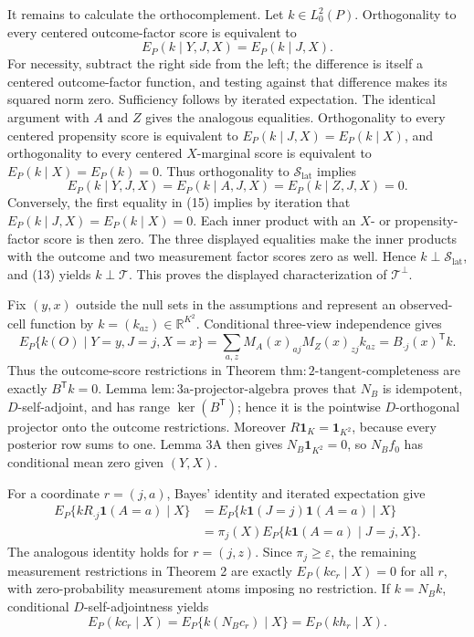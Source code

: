 It remains to calculate the orthocomplement.  Let \(k\in L^2_0(P)\).  Orthogonality to every centered outcome-factor score is equivalent to
\[
 E_P(k\mid Y,J,X)=E_P(k\mid J,X). \tag{14}
\]
For necessity, subtract the right side from the left; the difference is itself a centered outcome-factor function, and testing against that difference makes its squared norm zero.  Sufficiency follows by iterated expectation.  The identical argument with \(A\) and \(Z\) gives the analogous equalities.  Orthogonality to every centered propensity score is equivalent to
\(E_P(k\mid J,X)=E_P(k\mid X)\), and orthogonality to every centered \(X\)-marginal score is equivalent to \(E_P(k\mid X)=E_P(k)=0\).  Thus orthogonality to \(\mathcal S_{\mathrm{lat}}\) implies
\[
 E_P(k\mid Y,J,X)=E_P(k\mid A,J,X)=E_P(k\mid Z,J,X)=0. \tag{15}
\]
Conversely, the first equality in (15) implies by iteration that \(E_P(k\mid J,X)=E_P(k\mid X)=0\).  Each inner product with an \(X\)- or propensity-factor score is then zero.  The three displayed equalities make the inner products with the outcome and two measurement factor scores zero as well.  Hence \(k\perp\mathcal S_{\mathrm{lat}}\), and (13) yields \(k\perp\mathcal T\).  This proves the displayed characterization of \(\mathcal T^\perp\).

Fix \((y,x)\) outside the null sets in the assumptions and represent an observed-cell function by \(k=(k_{az})\in\mathbb R^{K^2}\).  Conditional three-view independence gives
\[
 E_P\{k(O)\mid Y=y,J=j,X=x\}
 =\sum_{a,z}M_A(x)_{aj}M_Z(x)_{zj}k_{az}
 =B_{\cdot j}(x)^{\mathsf T}k. \tag{16}
\]
Thus the outcome-score restrictions in Theorem \(\mathrm{thm{:}2\mbox{-}tangent\mbox{-}completeness}\) are exactly \(B^{\mathsf T}k=0\).  Lemma \(\mathrm{lem{:}3a\mbox{-}projector\mbox{-}algebra}\) proves that \(N_B\) is idempotent, \(D\)-self-adjoint, and has range \(\ker(B^{\mathsf T})\); hence it is the pointwise \(D\)-orthogonal projector onto the outcome restrictions.  Moreover \(R\mathbf 1_K=\mathbf 1_{K^2}\), because every posterior row sums to one.  Lemma 3A then gives \(N_B\mathbf 1_{K^2}=0\), so \(N_Bf_0\) has conditional mean zero given \((Y,X)\).

For a coordinate \(r=(j,a)\), Bayes' identity and iterated expectation give
\[
\begin{aligned}
 E_P\{kR_{\cdot j}\mathbf 1(A=a)\mid X\}
 &=E_P\{k\mathbf 1(J=j)\mathbf 1(A=a)\mid X\}\\
 &=\pi_j(X)E_P\{k\mathbf 1(A=a)\mid J=j,X\}. \tag{17}
\end{aligned}
\]
The analogous identity holds for \(r=(j,z)\).  Since \(\pi_j\geq\varepsilon\), the remaining measurement restrictions in Theorem 2 are exactly \(E_P(kc_r\mid X)=0\) for all \(r\), with zero-probability measurement atoms imposing no restriction.  If \(k=N_Bk\), conditional \(D\)-self-adjointness yields
\[
 E_P(kc_r\mid X)=E_P\{k(N_Bc_r)\mid X\}=E_P(kh_r\mid X). \tag{18}
\]

